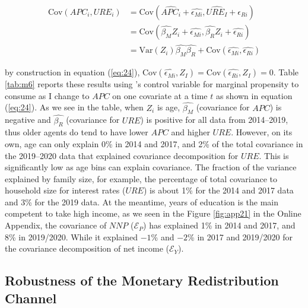 \documentclass[11pt,letterpaper]{article}
\begin{document}
\begin{equation}\label{eq:24}
	\begin{align*}
		\mathrm{Cov} (APC_{i}, URE_{i}) &= \mathrm{Cov}\left(\widehat{APC_{i}} + \widehat{\epsilon_{Mi}}, \widehat{URE_{I}} + \widehat{\epsilon_{Ri}}\right) \\
		&= \mathrm{Cov}\left(\widehat{\beta_{M}}Z_{i} + \widehat{\epsilon_{Mi}}, \widehat{\beta_{R}}Z_{i} + \widehat{\epsilon_{Ri}}\right) \\
		&= \mathrm{Var} \left(Z_{i}\right)\widehat{\beta_{M}}\widehat{\beta_{R}} + \mathrm{Cov} \left(\widehat{\epsilon_{Mi}}, \widehat{\epsilon_{Ri}}\right)
	\end{align*}
\end{equation}

\noindent by construction in equation (\ref{eq:24}), $\mathrm{Cov}(\widehat{\epsilon_{Mi}},Z_{I}) = \mathrm{Cov}(\widehat{\epsilon_{Ri}},Z_{I}) = 0$. Table \ref{tab:m6} reports these results using \citet{Jappelli2014}’s control variable for marginal propensity to consume as I change to $APC$ on one covariate at a time $t$ as shown in equation (\ref{eq:24}). As we see in the table, when $Z_{i}$ is age, $\widehat{\beta_{M}}$ (covariance for $APC$) is negative and $\widehat{\beta_{R}}$ (covariance for $URE$) is positive for all data from 2014--2019, thus older agents do tend to have lower $APC$ and higher $URE$. However, on its own, age can only explain 0\% in 2014 and 2017, and 2\% of the total covariance in the 2019--2020 data that explained covariance decomposition for $URE$. This is significantly low as age bins can explain covariance. The fraction of the variance explained by family size, for example, the percentage of total covariance to household size for interest rates ($URE$) is about 1\% for the 2014 and 2017 data and 3\% for the 2019 data. At the meantime, years of education is the main competent to take high income, as we seen in the Figure \ref{fig:app21} in the Online Appendix, the covariance of $NNP$ ($\mathcal{E}_{P}$) has explained 1\% in 2014 and 2017, and 8\% in 2019/2020. While it explained $-1$\% and $-2$\% in 2017 and 2019/2020 for the covariance decomposition of net income ($\mathcal{E}_{Y}$).



\subsection{Robustness of the Monetary Redistribution Channel}
\end{document}
